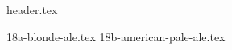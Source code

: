 \clearpage
{}
\divisorLine

{header.tex}

\begin{multicols}{2}

{18a-blonde-ale.tex}
{18b-american-pale-ale.tex}

\end{multicols}